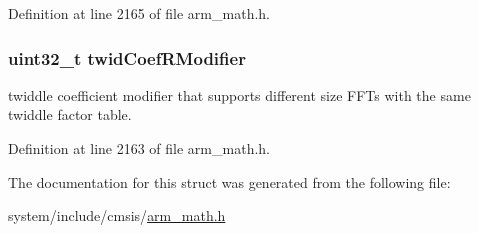 Definition at line 2165 of file arm\+\_\+math.\+h.

\subsubsection[{\texorpdfstring{twid\+Coef\+R\+Modifier}{twidCoefRModifier}}]{\setlength{\rightskip}{0pt plus 5cm}uint32\+\_\+t twid\+Coef\+R\+Modifier}\hypertarget{structarm__rfft__instance__q15_a5b06f7f76c018db993fe6acc5708c589}{}\label{structarm__rfft__instance__q15_a5b06f7f76c018db993fe6acc5708c589}
twiddle coefficient modifier that supports different size F\+F\+Ts with the same twiddle factor table. 

Definition at line 2163 of file arm\+\_\+math.\+h.



The documentation for this struct was generated from the following file\+:\begin{DoxyCompactItemize}
\item 
system/include/cmsis/\hyperlink{arm__math_8h}{arm\+\_\+math.\+h}\end{DoxyCompactItemize}
